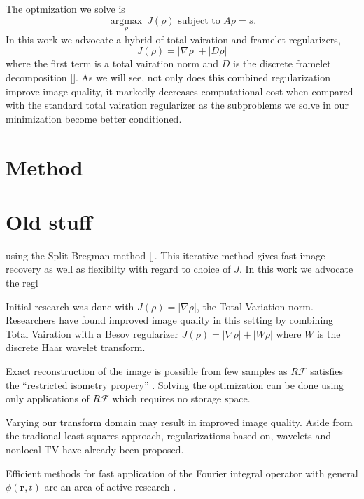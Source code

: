 \documentclass[11pt]{amsart}
\theoremstyle{remark}
\begin{document}
The optmization we solve is
\begin{equation}\label{gcsequ}
\underset{\rho}{\operatorname{argmax}} \: J(\rho)  \text{ subject to } A \rho = s.
\end{equation}
In this work we advocate a hybrid of total vairation and framelet regularizers,
\begin{equation}
J(\rho) = | \nabla \rho| + | D \rho |
\end{equation}
where the first term is a total vairation norm and $D$ is the discrete framelet decomposition []. As we will see, not only does this combined regularization improve image quality, it markedly decreases computational cost when compared with the standard total vairation regularizer as the subproblems we solve in our minimization become better conditioned.

\section{Method}

\section{Old stuff}


using the Split Bregman method []. This iterative method gives fast image recovery as well as flexibilty with regard to choice of $J$. In this work we advocate the regl



Initial research was done with $J(\rho) = | \nabla \rho|$, the Total Variation norm. Researchers have found improved image quality in this setting by combining Total Vairation with a Besov regularizer 
$J(\rho) = | \nabla \rho| + | W \rho |$ where $W$ is the discrete Haar wavelet transform.

Exact reconstruction of the image is possible from few samples as $R\mathcal{F}$ satisfies the ``restricted isometry propery'' \cite{Candes2006}. Solving the optimization can be done using only applications of $R\mathcal{F}$ which requires no storage space.

Varying our transform domain may result in improved image quality. Aside from the tradional least squares approach, regularizations based on, wavelets \cite{Lustig2007} and nonlocal TV have already been proposed. 
 







Efficient methods for fast application of the Fourier integral operator with general $\phi(\mathbf{r},t)$ are an area of active research \cite{Cand2006}. 
\end{document}
